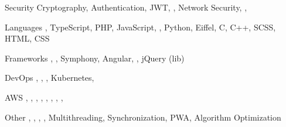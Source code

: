 

\begin{cvskills}

\cvskill
  {Security} %
  {Cryptography, Authentication, JWT, , Network Security, , } %

\cvskill
  {Languages} %
  {, TypeScript, PHP, JavaScript, , Python, Eiffel, C, C++, SCSS, HTML, CSS} %

\cvskill
  {Frameworks} %
  {, , Symphony, Angular, , jQuery (lib)} %


\cvskill
  {DevOps} %
  {, , , Kubernetes, } %

\cvskill
  {AWS} %
  {, , , , , , , , } %


\cvskill
  {Other} %
  {, , , , Multithreading, Synchronization, PWA, Algorithm Optimization} %

\end{cvskills}
